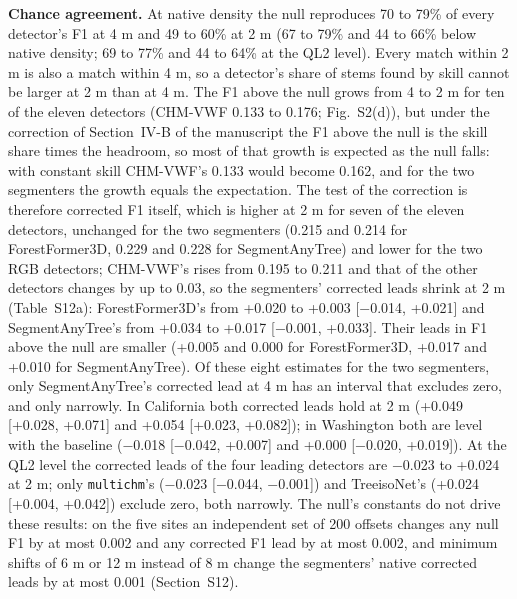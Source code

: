 \documentclass[10pt]{article}
\begin{document}
\textbf{Chance agreement.} At native density the null reproduces 70 to 79\% of every
detector's F1 at 4 m and 49 to 60\% at 2 m (67 to 79\% and 44 to 66\% below native
density; 69 to 77\% and 44 to 64\% at the QL2 level). Every match within 2 m is
also a match within 4 m, so a detector's share of stems found by skill cannot be
larger at 2 m than at 4 m. The F1 above the null grows from 4 to 2 m for ten of
the eleven detectors (CHM-VWF 0.133 to 0.176; Fig.~S2(d)), but under the
correction of Section~IV-B of the manuscript the F1 above the null is the skill
share times the headroom, so most of that growth is expected as the null falls:
with constant skill CHM-VWF's 0.133 would become 0.162, and for the two
segmenters the growth equals the expectation. The test of the correction is
therefore corrected F1 itself, which is higher at 2 m for seven of the eleven
detectors, unchanged for the two segmenters (0.215 and 0.214 for ForestFormer3D,
0.229 and 0.228 for SegmentAnyTree) and lower for the two RGB detectors;
CHM-VWF's rises from 0.195 to 0.211 and that of the other detectors changes by
up to 0.03, so the segmenters' corrected leads shrink at 2 m (Table~S12a):
ForestFormer3D's from +0.020 to +0.003 [$-$0.014, +0.021] and SegmentAnyTree's
from +0.034 to +0.017 [$-$0.001, +0.033]. Their leads in F1 above the null are
smaller (+0.005 and 0.000 for ForestFormer3D, +0.017 and +0.010 for
SegmentAnyTree). Of these eight estimates for the two segmenters, only
SegmentAnyTree's corrected lead at 4 m has an interval that excludes zero, and
only narrowly. In California both corrected leads hold at 2 m (+0.049 [+0.028,
+0.071] and +0.054 [+0.023, +0.082]); in Washington both are level with the
baseline ($-$0.018 [$-$0.042, +0.007] and +0.000 [$-$0.020, +0.019]). At the QL2 level
the corrected leads of the four leading detectors are $-$0.023 to +0.024 at 2 m;
only \texttt{multichm}'s ($-$0.023 [$-$0.044, $-$0.001]) and TreeisoNet's (+0.024 [+0.004,
+0.042]) exclude zero, both narrowly. The null's constants do not drive these
results: on the five sites an independent set of 200 offsets changes any null F1
by at most 0.002 and any corrected F1 lead by at most 0.002, and minimum shifts
of 6 m or 12 m instead of 8 m change the segmenters' native corrected leads by
at most 0.001 (Section~S12).
\end{document}
